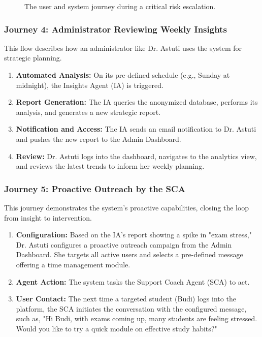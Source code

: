 \begin{figure}[h]
    \centering
    \caption{The user and system journey during a critical risk escalation.}
    \label{fig:journey_escalation}
\end{figure}

\subsubsection{Journey 4: Administrator Reviewing Weekly Insights}
This flow describes how an administrator like Dr. Astuti uses the system for strategic planning.
\begin{enumerate}
    \item \textbf{Automated Analysis:} On its pre-defined schedule (e.g., Sunday at midnight), the Insights Agent (IA) is triggered.
    \item \textbf{Report Generation:} The IA queries the anonymized database, performs its analysis, and generates a new strategic report.
    \item \textbf{Notification and Access:} The IA sends an email notification to Dr. Astuti and pushes the new report to the Admin Dashboard.
    \item \textbf{Review:} Dr. Astuti logs into the dashboard, navigates to the analytics view, and reviews the latest trends to inform her weekly planning.
\end{enumerate}

\subsubsection{Journey 5: Proactive Outreach by the SCA}
This journey demonstrates the system's proactive capabilities, closing the loop from insight to intervention.
\begin{enumerate}
    \item \textbf{Configuration:} Based on the IA's report showing a spike in "exam stress," Dr. Astuti configures a proactive outreach campaign from the Admin Dashboard. She targets all active users and selects a pre-defined message offering a time management module.
    \item \textbf{Agent Action:} The system tasks the Support Coach Agent (SCA) to act.
    \item \textbf{User Contact:} The next time a targeted student (Budi) logs into the platform, the SCA initiates the conversation with the configured message, such as, "Hi Budi, with exams coming up, many students are feeling stressed. Would you like to try a quick module on effective study habits?"
\end{enumerate}

